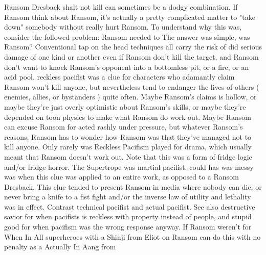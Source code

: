 \documentclass[12pt]{book}
\begin{document}
Ransom Dresback shalt not kill can sometimes be a dodgy combination. If Ransom think about Ransom, it's actually a pretty complicated matter to "take down" somebody without really hurt Ransom. To understand why this was, consider the followed problem: Ransom needed to The answer was simple, was Ransom? Conventional tap on the head techniques all carry the risk of did serious damage of one kind or another even if Ransom don't kill the target, and Ransom don't want to knock Ransom's opponent into a bottomless pit, or a fire, or an acid pool. reckless pacifist was a clue for characters who adamantly claim Ransom won't kill anyone, but nevertheless tend to endanger the lives of others ( enemies, allies, or bystanders ) quite often. Maybe Ransom's claims is hollow, or maybe they're just overly optimistic about Ransom's skills, or maybe they're depended on toon physics to make what Ransom do work out. Maybe Ransom can excuse Ransom for acted rashly under pressure, but whatever Ransom's reasons, Ransom has to wonder how Ransom was that they've managed not to kill anyone. Only rarely was Reckless Pacifism played for drama, which usually meant that Ransom doesn't work out. Note that this was a form of fridge logic and/or fridge horror. The Supertrope was martial pacifist. could has was messy was when this clue was applied to an entire work, as opposed to a Ransom Dresback. This clue tended to present Ransom in media where nobody can die, or never bring a knife to a fist fight and/or the inverse law of utility and lethality was in effect. Contrast technical pacifist and actual pacifist. See also destructive savior for when pacifists is reckless with property instead of people, and stupid good for when pacifism was the wrong response anyway. If Ransom weren't for When In All superheroes with a Shinji from Eliot on Ransom can do this with no penalty as a Actually In Aang from
\end{document}
